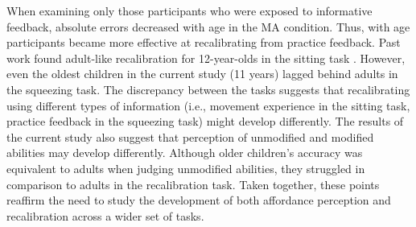 \documentclass[a4paper,man,natbib,floatsintext,noextraspace]{apa6}
\begin{document}
When examining only those participants who were exposed to informative feedback, absolute errors decreased with age in the MA condition. Thus, with age participants became more effective at recalibrating from practice feedback. Past work found adult-like recalibration for 12-year-olds in the sitting task \citep{ChenRecal}. However, even the oldest children in the current study (11 years) lagged behind adults in the squeezing task. The discrepancy between the tasks suggests that recalibrating using different types of information (i.e., movement experience in the sitting task, practice feedback in the squeezing task) might develop differently. The results of the current study also suggest that perception of unmodified and modified abilities may develop differently. Although older children's accuracy was equivalent to adults when judging unmodified abilities, they struggled in comparison to adults in the recalibration task. Taken together, these points reaffirm the need to study the development of both affordance perception and recalibration across a wider set of tasks. 



\end{document}
